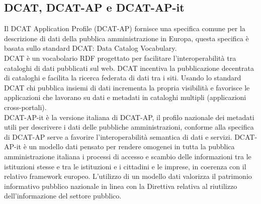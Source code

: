 \documentclass{article}
\theoremstyle{plain}
\theoremstyle{definition}
\begin{document}
\subsection{DCAT, DCAT-AP e DCAT-AP-it}
Il DCAT Application Profile (DCAT-AP) fornisce una specifica comune per la descrizione di dati della pubblica amministrazione in Europa, questa specifica è basata sullo standard DCAT: Data Catalog Vocabulary. \footnotemark
{} 
\\
DCAT è un vocabolario RDF progettato per facilitare l'interoperabilità tra cataloghi di dati pubblicati sul web. DCAT incentiva la pubblicazione decentrata di cataloghi e facilita la ricerca federata di dati tra i siti. Usando lo standard DCAT chi pubblica insiemi di dati incrementa la propria visibilità e favorisce le applicazioni che lavorano su dati e metadati in cataloghi multipli (applicazioni cross-portali).
\\
DCAT-AP-it è la versione italiana di DCAT-AP, il profilo nazionale dei metadati utili per descrivere i dati delle pubbliche amministrazioni, conforme alla specifica di DCAT-AP serve a favorire l'interoperabilità semantica di dati e servizi. DCAT-AP-it è un modello dati pensato per rendere omogenei in tutta la pubblica amministrazione italiana i processi di accesso e scambio delle informazioni tra le istituzioni stesse e tra le istituzioni e i cittadini e le imprese, in coerenza con il relativo framework europeo. L'utilizzo di un modello dati valorizza il patrimonio informativo pubblico nazionale in linea con la Direttiva relativa al riutilizzo dell'informazione del settore pubblico.
\end{document}
